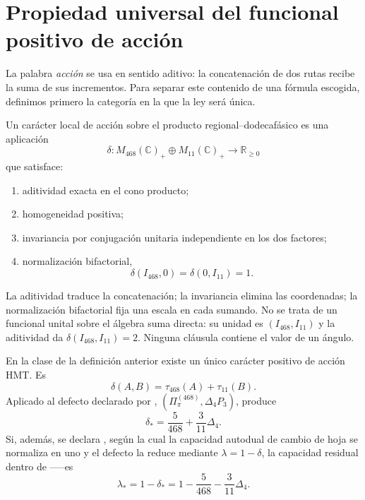 \section{Propiedad universal del funcional positivo de acción}

La palabra \emph{acción} se usa en sentido aditivo: la concatenación de dos
rutas recibe la suma de sus incrementos. Para separar este contenido de una
fórmula escogida, definimos primero la categoría en la que la ley será única.

\begin{definition}
\label{p3-20260826:def:caracter-accion-hmt}
Un carácter local de acción sobre el producto
regional--dodecafásico es una aplicación
\[
 \delta:
 M_{468}(\mathbb C)_+\oplus M_{11}(\mathbb C)_+
 \longrightarrow\mathbb R_{\ge0}
\]
que satisface:
\begin{enumerate}
  \item aditividad exacta en el cono producto;
  \item homogeneidad positiva;
  \item invariancia por conjugación unitaria independiente en los dos
  factores;
  \item normalización bifactorial,
  \[
  \delta(I_{468},0)=\delta(0,I_{11})=1.
  \]
\end{enumerate}
\end{definition}

La aditividad traduce la concatenación; la invariancia elimina las
coordenadas; la normalización bifactorial fija una escala en cada sumando.
No se trata de un funcional unital sobre el álgebra suma directa: su unidad
es \((I_{468},I_{11})\) y la aditividad da
\(\delta(I_{468},I_{11})=2\). Ninguna cláusula contiene el valor de un
ángulo.

\begin{theorem}
\label{p3-20260826:thm:ley-accion-hmt}
En la clase de la definición anterior existe un único carácter positivo de
acción HMT\@. Es
\[
 \boxed{\delta(A,B)=\tau_{468}(A)+\tau_{11}(B).}
\]
Aplicado al defecto declarado por \HDef,
\((\Pi_\pi^{(468)},\Delta_4P_3)\), produce
\[
 \delta_*=\frac5{468}+\frac3{11}\Delta_4.
\]
Si, además, se declara \HRes, según la cual la capacidad autodual de cambio de
hoja se normaliza en uno y el defecto la reduce mediante
\(\lambda=1-\delta\), la capacidad residual dentro de \HTr--\HAdd--\HDef--\HRes es
\[
 \boxed{
 \lambda_*
 =1-\delta_*
 =1-\frac5{468}-\frac3{11}\Delta_4.
 }
\]
\end{theorem}

